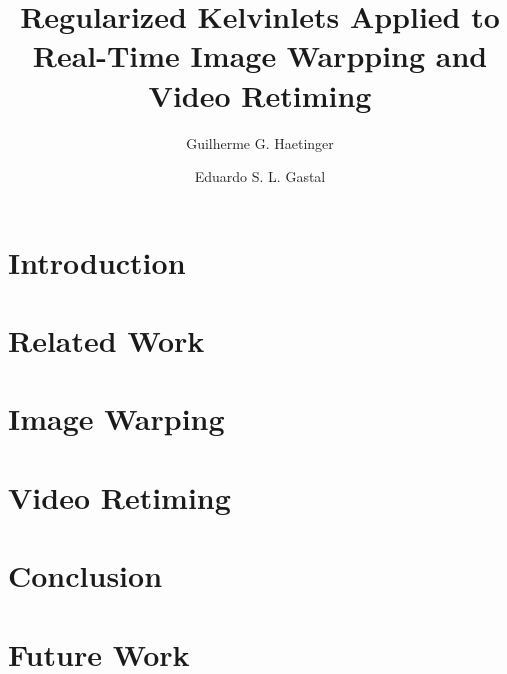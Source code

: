 \documentclass[10pt, conference]{IEEEtran}
\author[1]{Guilherme G. Haetinger}
\author[1]{Eduardo S. L. Gastal}
\affil[1]{Universidade Federal do Rio Grande do Sul}
\date{}
\title{Regularized Kelvinlets Applied to Real-Time Image Warpping and Video Retiming}
\begin{document}
\maketitle
\begin{abstract}
\end{abstract}

\section{Introduction}
\label{sec:orgecedf30}
\section{Related Work}
\label{sec:org7e934c1}
\section{Image Warping}
\label{sec:orge3a53ee}

\section{Video Retiming}
\label{sec:org330ed76}
\section{Conclusion}
\label{sec:org6f4538e}
\section{Future Work}
\label{sec:org127d858}



\end{document}
